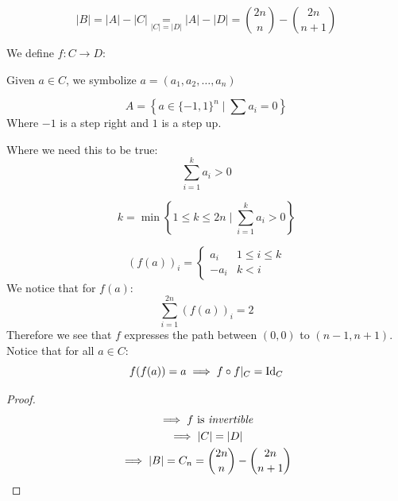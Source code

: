 \documentclass[00_complete]{subfiles}
\begin{document}
$$|B| = |A| - |C| \underset{|C|=|D|}{=} |A| - |D| = \binom{2n}{n}-\binom{2n}{n+1}$$

We define $f: C \to D$:

Given $a \in C$, we symbolize $a=(a_1,a_2,\dots,a_n)$

$$A = \left\{a \in \{-1,1\}^n \mid \sum a_i = 0 \right\}$$
Where $-1$ is a step right and $1$ is a step up.

Where we need this to be true:
$$\sum_{i=1}^{k}a_i>0$$

$$k=\min\left\{1 \leq k\leq 2n \mid \sum_{i=1}^{k}a_i>0\right\}$$

$$(f(a))_i = \begin{cases}
    a_i & 1 \leq i \leq k \\
    -a_i & k < i
\end{cases}$$
We notice that for $f(a)$:
$$\sum_{i=1}^{2n}(f(a))_i = 2$$
Therefore we see that $f$ expresses the path between $(0,0)$ to $(n-1,n+1)$.
Notice that for  all $a \in C$:
$$f(f(a))=a \implies f \circ f |_C = \operatorname{Id}_C$$
\begin{proof}
$$
\begin{gathered}
    \implies f \text{ is \emph{invertible}} \\
    \implies |C| = |D| \\
    \implies |B| = C_n = \binom{2n}{n} - \binom{2n}{n+1}
\end{gathered}
$$
\end{proof}
\end{document}
